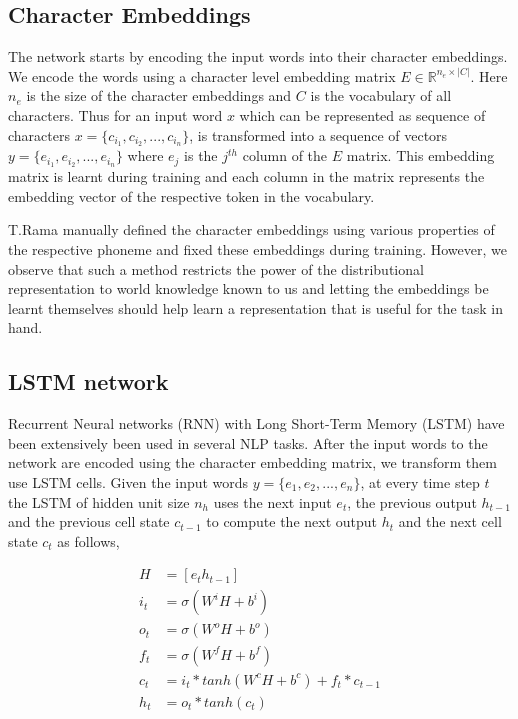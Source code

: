 \subsection{Character Embeddings}

The network starts by encoding the input words into their character embeddings. We encode the words using a character level embedding matrix $E \in \mathbb{R}^{n_e \times |C|}$. Here $n_e$ is the size of the character embeddings and $C$ is the vocabulary of all characters. Thus for an input word $x$ which can be represented as sequence of characters $x = \{c_{i_1}, c_{i_2}, ..., c_{i_n}\}$, is transformed into a sequence of vectors $y = \{e_{i_1}, e_{i_2}, ..., e_{i_n}\}$ where $e_j$ is the $j^{th}$ column of the $E$ matrix. This embedding matrix is learnt during training and each column in the matrix represents the embedding vector of the respective token in the vocabulary. 

T.Rama \citep{rama2016siamese} manually defined the character embeddings using various properties of the respective phoneme and fixed these embeddings during training. However, we observe that such a method restricts the power of the distributional representation to world knowledge known to us and letting the embeddings be learnt themselves should help learn a representation that is useful for the task in hand.

\subsection{LSTM network}

Recurrent Neural networks (RNN) with Long Short-Term Memory (LSTM) have been extensively been used in several NLP tasks. After the input words to the network are encoded using the character embedding matrix, we transform them use LSTM cells. Given the input words $y = \{e_1, e_2, ..., e_n\}$, at every time step $t$ the LSTM of hidden unit size $n_h$ uses the next input $e_t$, the previous output $h_{t-1}$ and the previous cell state $c_{t-1}$ to compute the next output $h_t$ and the next cell state $c_t$ as follows,

\begin{align}
H &= [e_t h_{t-1}] \\
i_t &= \sigma (W^iH + b^i) \\
o_t &= \sigma (W^oH + b^o) \\
f_t &= \sigma (W^fH + b^f) \\
c_t &= i_t * tanh(W^cH + b^c) + f_t * c_{t-1} \\
h_t &= o_t * tanh(c_t)
\end{align}

